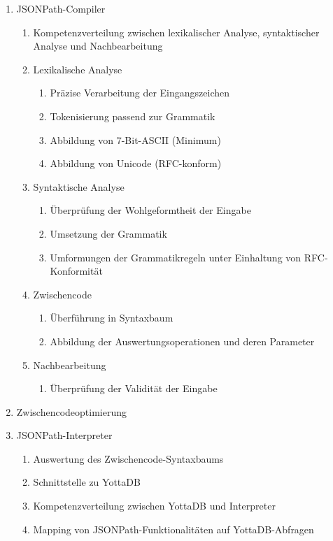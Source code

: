 \documentclass[oneside]{ausarbeitung}
\begin{document}
\begin{enumerate}
	\item JSONPath-Compiler
	\begin{enumerate}
		\item Kompetenzverteilung zwischen lexikalischer Analyse, syntaktischer Analyse und Nachbearbeitung
		\item Lexikalische Analyse
		\begin{enumerate}
			\item Präzise Verarbeitung der Eingangszeichen
			\item Tokenisierung passend zur Grammatik
			\item Abbildung von 7-Bit-ASCII (Minimum)
			\item Abbildung von Unicode (RFC-konform)
		\end{enumerate}
		\item Syntaktische Analyse
		\begin{enumerate}
			\item Überprüfung der Wohlgeformtheit der Eingabe
			\item Umsetzung der Grammatik
			\item Umformungen der Grammatikregeln unter Einhaltung von RFC-Konformität
		\end{enumerate}
		\item Zwischencode
		\begin{enumerate}
			\item Überführung in Syntaxbaum
			\item Abbildung der Auswertungsoperationen und deren Parameter
		\end{enumerate}
		\item Nachbearbeitung
		\begin{enumerate}
			\item Überprüfung der Validität der Eingabe
		\end{enumerate}

	\end{enumerate}
		
	\item Zwischencodeoptimierung
	
	\item JSONPath-Interpreter
	\begin{enumerate}
		\item Auswertung des Zwischencode-Syntaxbaums
		\item Schnittstelle zu YottaDB
		\item Kompetenzverteilung zwischen YottaDB und Interpreter
		\item Mapping von JSONPath-Funktionalitäten auf YottaDB-Abfragen
	\end{enumerate}
	

\end{enumerate}
\end{document}
